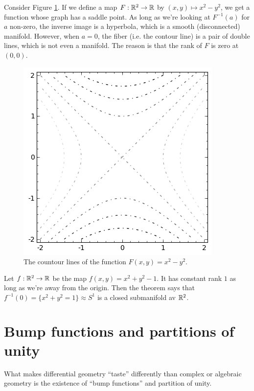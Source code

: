 \documentclass[11pt, english]{article}
\begin{document}
\begin{example}
Consider Figure \ref{contour}. If we define a map $F:\mathbb{R}^2\to \mathbb{R}$ by $(x,y) \mapsto x^2-y^2$, we get a function whose graph has a saddle point. As long as we're looking at $F^{-1}(a)$ for $a$ non-zero, the inverse image is a hyperbola, which is a smooth (disconnected) manifold. However, when $a=0$, the fiber (i.e. the contour line) is a pair of double lines, which is not even a manifold. The reason is that the rank of $F$ is zero at $(0,0)$.
\begin{figure}[ht]
\begin{center}
\includegraphics[scale=0.7]{contours}
\end{center}
\caption{The countour lines of the function $F(x,y)=x^2-y^2$.}
\label{contour}
\end{figure}
\end{example}

\begin{example}
Let $f:\mathbb{R}^2 \to \mathbb{R}$ be the map $f(x,y)=x^2+y^2-1$. It has constant rank $1$ as long as we're away from the origin. Then the theorem says that $f^{-1}(0)=\{ x^2+y^2=1 \}\approx S^1$ is a closed submanifold av $\mathbb{R}^2$.
\end{example}

\newpage
\section{Bump functions and partitions of unity}

What makes differential geometry ``taste'' differently than complex or algebraic geometry is the existence of ``bump functions'' and partition of unity.
\end{document}
